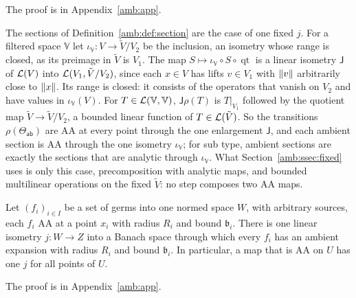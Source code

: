 The proof is in Appendix~\ref{amb:app}.

\begin{remark}\label{amb:rem:one-envelope}
The sections of Definition~\ref{amb:def:section} are the case of one fixed $j$. For a filtered space $\mathbb V$ let $\iota_{\mathbb V}\colon V\to\tilde V/V_2$ be the inclusion, an isometry whose range is closed, as its preimage in $\tilde V$ is $V_1$. The map $S\mapsto\iota_{\mathbb V}\circ S\circ\operatorname{qt}$ is a linear isometry $\mathsf J$ of $\mathcal L(V)$ into $\mathcal L(V_1,\tilde V/V_2)$, since each $x\in V$ has lifts $v\in V_1$ with $\lVert v\rVert$ arbitrarily close to $\lVert x\rVert$. Its range is closed: it consists of the operators that vanish on $V_2$ and have values in $\iota_{\mathbb V}(V)$. For $T\in\mathcal L(\mathbb V,\mathbb V)$, $\mathsf J\rho(T)$ is $T|_{V_1}$ followed by the quotient map $\tilde V\to\tilde V/V_2$, a bounded linear function of $T\in\mathcal L(\tilde V)$. So the transitions $\rho(\Theta_{\mathsf{ab}})$ are AA at every point through the one enlargement $\mathsf J$, and each ambient section is AA through the one isometry $\iota_{\mathbb V}$; for sub type, ambient sections are exactly the sections that are analytic through $\iota_{\mathbb V}$. What Section~\ref{amb:ssec:fixed} uses is only this case, precomposition with analytic maps, and bounded multilinear operations on the fixed $\tilde V$: no step composes two AA maps.
\end{remark}

\begin{theorem}\label{amb:thm:one-enlargement}
Let $(f_i)_{i\in I}$ be a set of germs into one normed space $W$, with arbitrary sources, each $f_i$ AA at a point $x_i$ with radius $R_i$ and bound $\mathfrak b_i$. There is one linear isometry $j\colon W\to Z$ into a Banach space through which every $f_i$ has an ambient expansion with radius $R_i$ and bound $\mathfrak b_i$. In particular, a map that is AA on $U$ has one $j$ for all points of $U$.
\end{theorem}

The proof is in Appendix~\ref{amb:app}.

